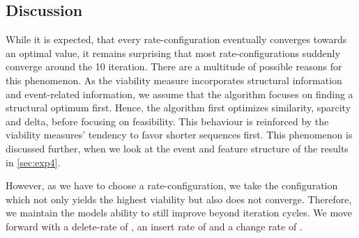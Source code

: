 \documentclass[./../../paper.tex]{subfiles}
\begin{document}



\subsection{Discussion}
While it is expected, that every rate-configuration eventually converges towards an optimal value, it remains surprising that most rate-configurations suddenly converge around the 10 iteration. There are a multitude of possible reasons for this phenomenon. As the viability measure incorporates structural information and event-related information, we assume that the algorithm focuses on finding a structural optimum first. Hence, the algorithm first optimizes similarity, sparcity and delta, before focusing on feasibility. This behaviour is reinforced by the viability measures' tendency to favor shorter sequences first. This phenomenon is discussed further, when we look at the event and feature structure of the results in \autoref{sec:exp4}.


However, as we have to choose a rate-configuration, we take the configuration which not only yields the highest viability but also does not converge. Therefore, we maintain the models ability to still improve beyond  iteration cycles.
We move forward with a delete-rate of , an insert rate of  and a change rate of .
\end{document}
